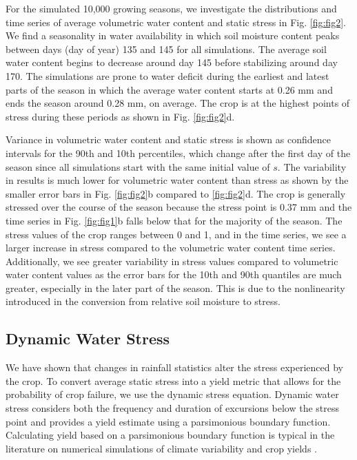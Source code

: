 For the simulated 10,000 growing seasons, we investigate the distributions and time series of average volumetric water content and static stress in Fig. \ref{fig:fig2}. We find a seasonality in water availability in which soil moisture content peaks between days (day of year) 135 and 145 for all simulations. The average soil water content begins to decrease around day 145 before stabilizing around day 170. The simulations are prone to water deficit during the earliest and latest parts of the season in which the average water content starts at 0.26 mm and ends the season around 0.28 mm, on average. The crop is at the highest points of stress during these periods as shown in Fig. \ref{fig:fig2}d. %

Variance in volumetric water content and static stress is shown as confidence intervals for the 90th and 10th percentiles, which change after the first day of the season since all simulations start with the same initial value of $s$. The variability in results is much lower for volumetric water content than stress as shown by the smaller error bars in Fig. \ref{fig:fig2}b compared to \ref{fig:fig2}d. The crop is generally stressed over the course of the season because the stress point is 0.37 mm and the time series in Fig. \ref{fig:fig1}b falls below that for the majority of the season. The stress values of the crop ranges between 0 and 1, and in the time series, we see a larger increase in stress compared to the volumetric water content time series. Additionally, we see greater variability in stress values compared to volumetric water content values as the error bars for the 10th and 90th quantiles are much greater, especially in the later part of the season. This is due to the nonlinearity introduced in the conversion from relative soil moisture to stress.

\subsection{Dynamic Water Stress}
We have shown that changes in rainfall statistics alter the stress experienced by the crop. To convert average static stress into a yield metric that allows for the probability of crop failure, we use the dynamic stress equation. Dynamic water stress considers both the frequency and duration of excursions below the stress point and provides a yield estimate using a parsimonious boundary function. Calculating yield based on a parsimonious boundary function is typical in the literature on numerical simulations of climate variability and crop yields \cite{van2013yield, roche2020climate}.  

